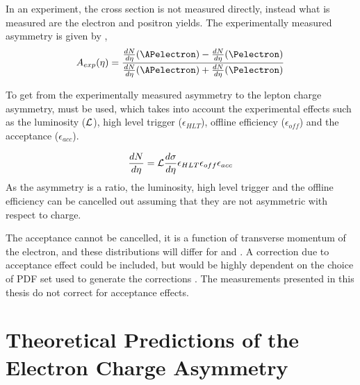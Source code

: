 In an experiment, the cross section is not measured directly, instead what is
measured are the electron and positron yields.  The experimentally measured
asymmetry is given by ,
\begin{equation}
A_{exp}(\eta)=\frac{  \frac{dN}{d\eta}(\APelectron) -
\frac{dN}{d\eta}(\Pelectron)}{\frac{dN}{d\eta}(\APelectron) +
\frac{dN}{d\eta}(\Pelectron)}
\label{eq:AsymExp}
\end{equation} 

To get from the experimentally measured asymmetry to the lepton charge
asymmetry,  must be used, which takes into
account the experimental effects such as the luminosity (${\cal L}$), high
level trigger ($\epsilon_{HLT}$), offline efficiency ($ \epsilon_{off}$) and
the acceptance ($\epsilon_{acc}$).

\begin{equation}
\frac{dN}{d\eta} = {\cal L } \frac{d\sigma}{d\eta}  \epsilon_{HLT}
\epsilon_{off} \epsilon_{acc}
\label{eq:NumEve}
\end{equation} 
As the asymmetry is a ratio, the luminosity, high level trigger and the
offline efficiency can be cancelled out assuming that they are not asymmetric
with respect to charge. 

The acceptance cannot be cancelled, it is a function of transverse momentum of
the electron, and these distributions will differ for \Pelectron and \APelectron.
A correction due to acceptance effect could be included, but would be highly
dependent on the choice of PDF set used to generate the corrections \cite{cdfWAsym}.
The measurements presented in this thesis do not correct for acceptance effects.


\section{ Theoretical Predictions of the Electron Charge Asymmetry }
\label{sec:asymuncert}

